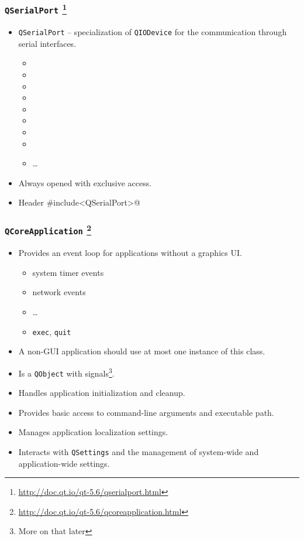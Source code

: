\begin{frame}[fragile]
  \frametitle{\texttt{QSerialPort}
    \footnote{\url{http://doc.qt.io/qt-5.6/qserialport.html}}}
  \begin{itemize}
    \item \texttt{QSerialPort} -- specialization of \texttt{QIODevice} for
      the communication through serial interfaces.
    \begin{itemize}
      \item \verb@baudRate@
      \item \verb@parity@
      \item \verb@dataBits@
      \item \verb@stopBits@
      \item \verb@flowControl@
      \item \verb@pinoutSignals@
      \item \verb@requestToSend@
      \item \verb@clear@
      \item \ldots
    \end{itemize}
    \item Always opened with exclusive access.
    \item Header \verb@#include<QSerialPort>@
  \end{itemize}
\end{frame}

\begin{frame}[fragile]
  \frametitle{\texttt{QCoreApplication}
    \footnote{\url{http://doc.qt.io/qt-5.6/qcoreapplication.html}}}
    \small
    \begin{itemize}
      \item Provides an event loop for applications without a graphics UI.
      \begin{itemize}
        \item system timer events
        \item network events
        \item \ldots
        \item \texttt{exec}, \texttt{quit}
      \end{itemize}
      \item A non-GUI application should use at most one instance of this class.
      \item Is a \texttt{QObject} with signals\footnote{More on that later}.
      \item Handles application initialization and cleanup.
      \item Provides basic access to command-line arguments and executable path.
      \item Manages application localization settings.
      \item Interacts with \texttt{QSettings} and the management of system-wide
        and application-wide settings.
    \end{itemize}
\end{frame}

